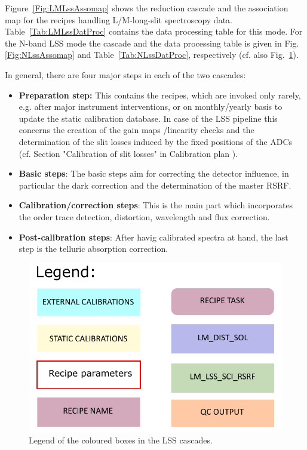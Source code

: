 
Figure~\ref{Fig:LMLssAssomap} shows the reduction cascade and the association map for the recipes handling L/M-long-slit
spectroscopy data.  Table~\ref{Tab:LMLssDatProc} contains the data processing table for this mode. For the N-band \ac{LSS} mode the cascade and the data processing table is given in Fig.\ref{Fig:NLssAssomap} and Table~\ref{Tab:NLssDatProc}, respectively (cf. also Fig.~\ref{Fig:LSScascadelegend}).

In general, there are four major steps in each of the two cascades:
\begin{itemize}
    \item \textbf{Preparation step:} This contains the recipes, which are invoked only rarely, e.g. after major instrument interventions, or on monthly/yearly basis to update the static calibration database. In case of the \ac{LSS} pipeline this concerns the creation of the gain maps /linearity checks and the determination of the slit losses induced by the fixed positions of the ADCs (cf. Section "Calibration of slit losses" in Calibration plan \cite{METIS-calibration_plan}).
    \item \textbf{Basic steps}: The basic steps aim for correcting the detector influence, in particular the dark correction and the determination of the master \ac{RSRF}.
    \item \textbf{Calibration/correction steps}: This is the main part which incorporates the order trace detection, distortion, wavelength and flux correction.
    \item \textbf{Post-calibration steps}: After havig calibrated spectra at hand, the last step is the telluric absorption correction.
\end{itemize}

\begin{figure}[ht]
  \centering
  \includegraphics[width=0.4\textheight]{figures/legend.pdf}
  \caption[Legend]{Legend of the coloured boxes in the \ac{LSS} cascades.}
  \label{Fig:LSScascadelegend}
\end{figure}
\clearpage

